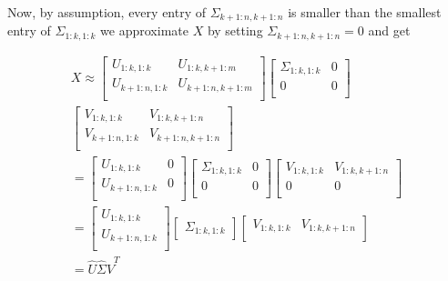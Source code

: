 \documentclass[conference]{IEEEtran}
\begin{document}
\noindent Now, by assumption, every entry of $\Sigma_{k+1:n,k+1:n}$ is smaller than the smallest
entry of $\Sigma_{1:k,1:k}$ we approximate $X$ by setting $\Sigma_{k+1:n,k+1:n}=0$
and get

\begin{align*}
X \approx 
\begin{bmatrix}
U_{1:k,1:k} & U_{1:k,k+1:m} \\
U_{k+1:n,1:k} & U_{k+1:n,k+1:m} \\
\end{bmatrix}
\begin{bmatrix}
\Sigma_{1:k,1:k} & 0 \\
0 & 0 \\
\end{bmatrix}\\
\begin{bmatrix}
V_{1:k,1:k} & V_{1:k,k+1:n} \\
V_{k+1:n,1:k} & V_{k+1:n,k+1:n} \\
\end{bmatrix} \\
= 
\begin{bmatrix}
U_{1:k,1:k} & 0 \\
U_{k+1:n,1:k} & 0 \\
\end{bmatrix}
\begin{bmatrix}
\Sigma_{1:k,1:k} & 0 \\
0 & 0 \\
\end{bmatrix}
\begin{bmatrix}
V_{1:k,1:k} & V_{1:k,k+1:n} \\
0 & 0 \\
\end{bmatrix} \\
= 
\begin{bmatrix}
U_{1:k,1:k} \\
U_{k+1:n,1:k} \\
\end{bmatrix}
\begin{bmatrix}
\Sigma_{1:k,1:k}
\end{bmatrix}
\begin{bmatrix}
V_{1:k,1:k} & V_{1:k,k+1:n} \\
\end{bmatrix} \\
= \hat{U} \hat{\Sigma} \hat{V}^T
\end{align*}
\end{document}
